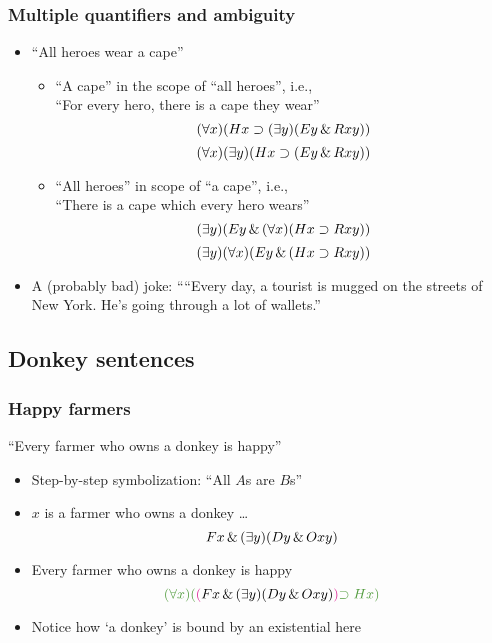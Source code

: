 \begin{frame}
    \frametitle{Multiple quantifiers and ambiguity}

\begin{itemize}[<+->]
\item ``All heroes wear a cape''
\begin{itemize}[<+->]
\item ``A cape'' in the scope of ``all heroes'', i.e.,\\
``For every hero, there is a cape they wear''\pauses
\[
(\forall x)(Hx \supset (\exists y)(Ey \,\&\, Rxy))
\]
\[
(\forall x)(\exists y)(Hx \supset (Ey \,\&\, Rxy))
\]
\item ``All heroes'' in scope of ``a cape'', i.e.,\\
``There is a cape which every hero wears''\pauses
\[
(\exists y)(Ey \,\&\, (\forall x)(Hx \supset Rxy))
\]
\[
(\exists y)(\forall x)(Ey \,\&\, (Hx \supset Rxy))
\]
\end{itemize}

\item A (probably bad) joke: ````Every day, a tourist is mugged on the streets of New York. He's going through a lot of wallets.'' %

\end{itemize}
\end{frame}


\subsection{Donkey sentences}

\begin{frame}
    \frametitle{Happy farmers}

``Every farmer who owns a donkey is happy''

\begin{itemize}[<+->]
\item Step-by-step symbolization: ``All $A$s are $B$s''
\item $x$ is a farmer who owns a donkey \dots\[
Fx \,\&\, (\exists y)(Dy \,\&\, Oxy)
\]
\item \textcolor{highlightA}{Every} farmer who owns a donkey \textcolor{highlightA}{is happy}
\[
\textcolor{highlightA}{\qt{\forall}{x}(}\textcolor{OGlyallpink}{(}F\qv{x} \land \qt{\exists}{y}(D\qv{y} \land O\qr{x}{y})\textcolor{OGlyallpink}{)} \textcolor{highlightA}{\eif H\qv{x})}
\]
\item Notice how `a donkey' is bound by an existential here
\end{itemize}
\end{frame}


